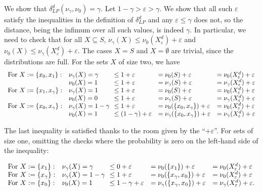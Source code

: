 \documentclass[10pt,a4paper]{article}
\begin{document}
We show that $\delta^{d}_{LP}(\nu_{\gamma},\nu_{0})=\gamma$. Let $1-\gamma>\varepsilon>\gamma$. We show that all such $\varepsilon$ satisfy the inequalities in the definition of $\delta^{d}_{LP}$ and any $\varepsilon\leq\gamma$ does not, so the distance, being the infimum over all such values, is indeed $\gamma$. In particular, we need to check that for all $X\subseteq S$, $\nu_{\gamma}(X)\leq\nu_{0}(X_{\varepsilon}^{d})+\varepsilon$ and $\nu_{0}(X)\leq\nu_{\gamma}(X_{\varepsilon}^{d})+\varepsilon$. The cases $X=S$ and $X=\emptyset$ are trivial, since the distributions are full. For the sets $X$ of size two, we have      \[\begin{array}[]{lllll}\mbox{For }X:=\{x_{0},x_{1}\}:&\nu_{\gamma}(X)=\gamma&\!\!\leq 1+\varepsilon&=\nu_{0}(S)+\varepsilon&=\nu_{0}(X^{d}_{\varepsilon})+\varepsilon\\
&\nu_{0}(X)=1&\!\!\leq 1+\varepsilon&=\nu_{\gamma}(S)+\varepsilon&=\nu_{\gamma}(X^{d}_{\varepsilon})+\varepsilon\\
\mbox{For }X:=\{x_{1},x_{\gamma}\}:&\nu_{\gamma}(X)=1&\!\!\leq 1+\varepsilon&=\nu_{0}(S)+\varepsilon&=\nu_{0}(X^{d}_{\varepsilon})+\varepsilon\\
&\nu_{0}(X)=0&\!\!\leq 1+\varepsilon&=\nu_{\gamma}(S)+\varepsilon&=\nu_{\gamma}(X^{d}_{\varepsilon})+\varepsilon\\
\mbox{For }X:=\{x_{0},x_{\gamma}\}:&\nu_{\gamma}(X)=1-\gamma&\!\!\leq 1+\varepsilon&=\nu_{0}(\{x_{0},x_{\gamma}\})+\varepsilon&=\nu_{0}(X^{d}_{\varepsilon})+\varepsilon\\
&\nu_{0}(X)=1&\!\!\leq(1-\gamma)+\varepsilon&=\nu_{\gamma}(\{x_{0},x_{\gamma}\})+\varepsilon&=\nu_{\gamma}(X^{d}_{\varepsilon})+\varepsilon\\
\end{array}\]\par
 
 
 
The last inequality is satisfied thanks to the room given by the “$+\varepsilon$”. For sets of size one, omitting the checks where the probability is zero on the left-hand side of the inequality:\par
  
\par  \quad  \[\begin{array}[]{lllll}\mbox{For }X:=\{x_{1}\}:&\nu_{\gamma}(X)=\gamma&\!\!\leq
0+\varepsilon&=\nu_{0}(\{x_{1}\})+\varepsilon&=\nu_{0}(X^{d}_{\varepsilon})+\varepsilon\\
\mbox{For }X:=\{x_{\gamma}\}:&\nu_{\gamma}(X)=1-\gamma&\!\!\leq 1+\varepsilon&=\nu_{0}(\{x_{\gamma},x_{0}\})+\varepsilon&=\nu_{0}(X^{d}_{\varepsilon})+\varepsilon\\
\mbox{For }X:=\{x_{0}\}:&\nu_{0}(X)=1&\!\!\leq 1-\gamma+\varepsilon&=\nu_{\gamma}(\{x_{\gamma},x_{0}\})+\varepsilon&=\nu_{\gamma}(X^{d}_{\varepsilon})+\varepsilon.\end{array}\]\quad  \quad  
  
\end{document}
